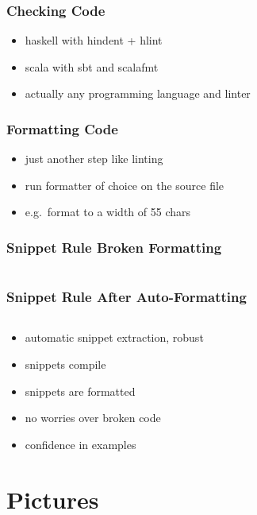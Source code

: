 \documentclass{beamer}
\begin{document}
\begin{frame}
  \frametitle{Checking Code}
  \begin{itemize}
  \item haskell with hindent + hlint
  \item scala with sbt and scalafmt
  \item actually any programming language and linter
  \end{itemize}
\end{frame}

\begin{frame}
  \frametitle{Formatting Code}
  \begin{itemize}
  \item just another step like linting
  \item run formatter of choice on the source file
  \item e.g.\ format to a width of 55 chars
  \end{itemize}
\end{frame}

\begin{frame}
  \frametitle{Snippet Rule \textemdash{} Broken Formatting}
  \begin{center}
    \inputminted[autogobble, highlightlines={3}]{haskell}{snippets/outer-haskell-snippet-rule.hs_noformat}
  \end{center}
\end{frame}

\begin{frame}
  \frametitle{Snippet Rule \textemdash{} After Auto-Formatting}
  \begin{center}
    \inputminted[autogobble, highlightlines={2-4}]{haskell}{snippets/haskell-snippet-rule.hs}
  \end{center}
\end{frame}

\begin{frame}
  \begin{itemize}
  \item automatic snippet extraction, robust
  \item snippets compile
  \item snippets are formatted
  \item no worries over broken code
  \item confidence in examples
  \end{itemize}
\end{frame}

\section{Pictures}
\end{document}
